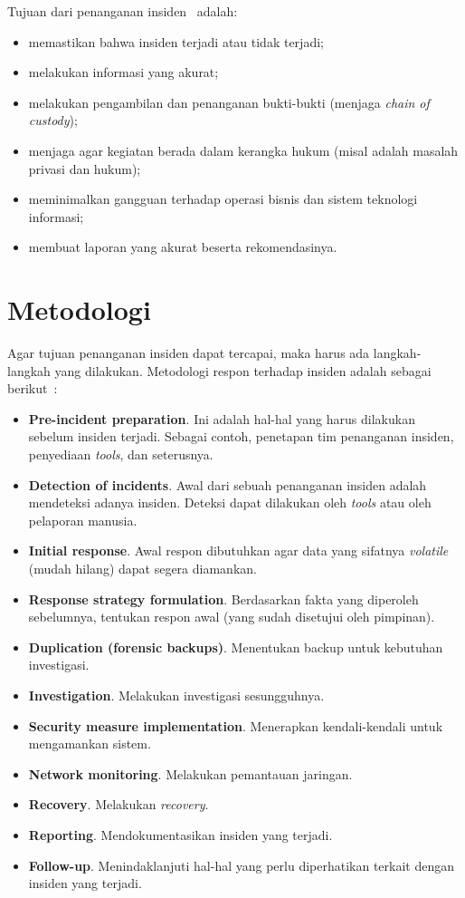 Tujuan dari penanganan insiden~\cite{mandiaincident} adalah:
\begin{itemize}
   \item memastikan bahwa insiden terjadi atau tidak terjadi;
   \item melakukan informasi yang akurat;
   \item melakukan pengambilan dan penanganan bukti-bukti
      (menjaga {\em chain of custody});
   \item menjaga agar kegiatan berada dalam kerangka hukum
      (misal adalah masalah privasi dan hukum);
   \item meminimalkan gangguan terhadap operasi bisnis dan
      sistem teknologi informasi;
   \item membuat laporan yang akurat beserta rekomendasinya.
\end{itemize}

\section{Metodologi}
Agar tujuan penanganan insiden dapat tercapai, maka harus ada langkah-langkah
yang dilakukan. 
Metodologi respon terhadap insiden adalah sebagai berikut~\cite{mandiaincident}:
\begin{itemize}
   \item {\bf Pre-incident preparation}. Ini adalah hal-hal yang harus
      dilakukan sebelum insiden terjadi. Sebagai contoh, penetapan tim
      penanganan insiden, penyediaan {\em tools}, dan seterusnya.
   \item {\bf Detection of incidents}. Awal dari sebuah penanganan insiden
      adalah mendeteksi adanya insiden. Deteksi dapat dilakukan oleh {\em
      tools} atau oleh pelaporan manusia.
   \item {\bf Initial response}. Awal respon dibutuhkan agar data yang sifatnya
      {\em volatile} (mudah hilang) dapat segera diamankan.
   \item {\bf Response strategy formulation}. Berdasarkan fakta yang diperoleh
      sebelumnya, tentukan respon awal (yang sudah disetujui oleh pimpinan).
   \item {\bf Duplication (forensic backups)}. Menentukan backup untuk
      kebutuhan investigasi.
   \item {\bf Investigation}. Melakukan investigasi sesungguhnya.
   \item {\bf Security measure implementation}. Menerapkan kendali-kendali
      untuk mengamankan sistem.
   \item {\bf Network monitoring}. Melakukan pemantauan jaringan.
   \item {\bf Recovery}. Melakukan {\em recovery}.
   \item {\bf Reporting}. Mendokumentasikan insiden yang terjadi.
   \item {\bf Follow-up}. Menindaklanjuti hal-hal yang perlu diperhatikan
      terkait dengan insiden yang terjadi.
\end{itemize}


